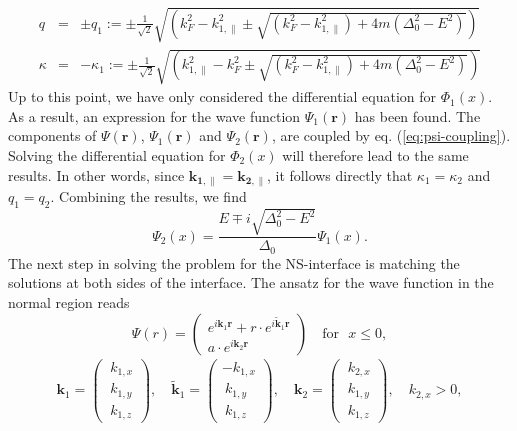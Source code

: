 \begin{eqnarray}
q &=& \pm q_1 := \pm \frac{1}{\sqrt{2}}\sqrt{\left( k_F^2 - k_{1, \parallel}^2 \pm \sqrt{ (k_F^2 - k_{1, \parallel}^2) + 4m(\Delta_0^2 - E^2)} \right)} \label{eq:q} \\
\kappa &=& - \kappa_1 := \pm \frac{1}{\sqrt{2}}\sqrt{\left( k_{1, \parallel}^2 - k_F^2 \pm \sqrt{ (k_F^2 - k_{1, \parallel}^2) + 4m(\Delta_0^2 - E^2)} \right)}\label{eq:kappa}
\end{eqnarray}
Up to this point, we have only considered the differential equation for $\Phi_1\left( x \right)$. As a result, an expression for the wave function $\Psi_1 \left( \mathbf{r} \right)$ has been found. The components of $\Psi \left( \mathbf{r} \right)$, $\Psi_1 \left( \mathbf{r} \right)$ and $\Psi_2 \left( \mathbf{r} \right)$, are coupled by eq. (\ref{eq:psi-coupling}). Solving the differential equation for $\Phi_2 \left( x \right)$ will therefore lead to the same results. In other words, since $\mathbf{k_{1, \parallel}} = \mathbf{k_{2, \parallel}}$, it follows directly that $\kappa_1 = \kappa_2$ and $q_1 = q_2$. 
Combining the results, we find 
\begin{equation}
\Psi_2 \left( x \right) = \frac{E \mp i \sqrt{\Delta_0^2 - E^2}}{\Delta_0} \Psi_1 \left( x \right).
\end{equation}
The next step in solving the problem for the NS-interface is matching the solutions at both sides of the interface. The ansatz for the wave function in the normal region reads
\begin{equation}
\Psi \left( r \right) = \begin{pmatrix}
e^{i \mathbf{k}_1 \mathbf{r}} + r \cdot e^{i \tilde{\mathbf{k}}_1 \mathbf{r}} \\
a \cdot e^{i \mathbf{k}_2 \mathbf{r}}
\end{pmatrix} \quad \text{for ~} x \leq 0,
\end{equation}
\begin{eqnarray}
\mathbf{k}_1  = \begin{pmatrix} ~k_{1, x} \\ ~k_{1, y}\\ ~k_{1, z} \end{pmatrix}, \quad \tilde{\mathbf{k}}_1  = \begin{pmatrix} -k_{1, x} \\ ~k_{1, y}\\ ~k_{1, z} \end{pmatrix}, \quad
\mathbf{k}_2  = \begin{pmatrix} ~k_{2, x} \\ ~k_{1, y}\\ ~k_{1, z} \end{pmatrix}, \quad k_{2, x} > 0,
\end{eqnarray}
